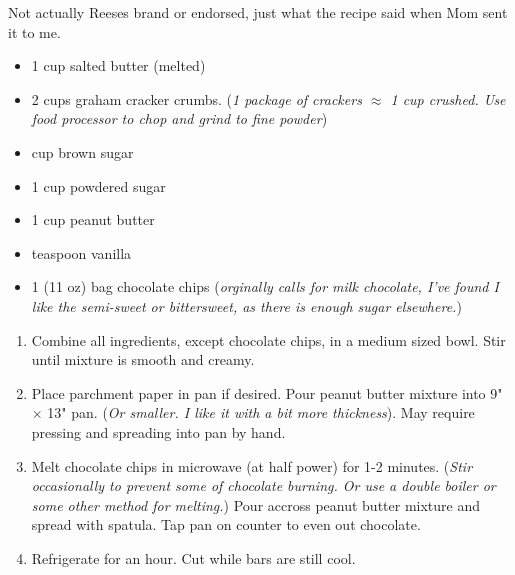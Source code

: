 
\fromMom 
Not actually Reeses brand or endorsed, just what the recipe said when
Mom sent it to me.

\ingredients
\begin{itemize}
    \item 1 cup salted butter (melted)
    \item 2 cups graham cracker crumbs. (\textit{1 package of crackers $\approx$ 1 cup crushed. Use food processor to chop and grind to fine powder})
    \item {} cup brown sugar
    \item 1  cup powdered sugar
    \item 1 cup peanut butter
    \item {} teaspoon vanilla
    \item 1 (11 oz) bag chocolate chips (\textit{orginally calls for milk chocolate, I've found I like the semi-sweet or bittersweet, as there is enough sugar elsewhere.})
\end{itemize}

\instructions
\begin{enumerate}
    \item Combine all ingredients, except chocolate chips, in a medium sized bowl. Stir until mixture is smooth and creamy.
    \item Place parchment paper in pan if desired. Pour peanut butter mixture into 9" $\times$ 13" pan. (\textit{Or smaller. I like it with a bit more thickness}). May require pressing and spreading into pan by hand. 
    \item Melt chocolate chips in microwave (at half power) for 1-2 minutes. (\textit{Stir occasionally to prevent some of chocolate burning. Or use a double boiler or some other method for melting.}) Pour accross peanut butter mixture and spread with spatula. Tap pan on counter to even out chocolate.
    \item Refrigerate for an hour. Cut while bars are still cool.
\end{enumerate}